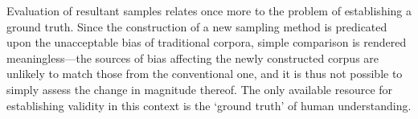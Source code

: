 Evaluation of resultant samples relates once more to the problem of establishing a ground truth.  Since the construction of a new sampling method is predicated upon the unacceptable bias of traditional corpora, simple comparison is rendered meaningless---the sources of bias affecting the newly constructed corpus are unlikely to match those from the conventional one, and it is thus not possible to simply assess the change in magnitude thereof.  The only available resource for establishing validity in this context is the `ground truth' of human understanding.  




